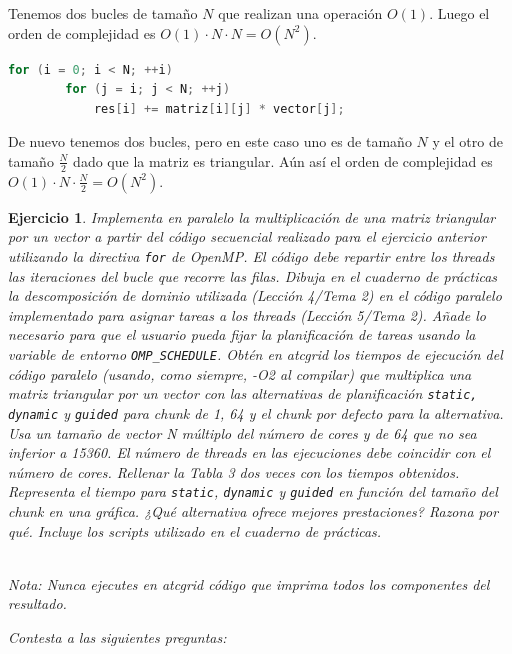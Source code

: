 \documentclass[11pt]{article}
\theoremstyle{definition-style}
\newtheorem{ejer}{Ejercicio}
\begin{document}
Tenemos dos bucles de tamaño $N$ que realizan una operación $O(1)$. Luego el orden de complejidad es $O(1) \cdot N \cdot N = O(N^2)$.

\begin{lstlisting}[language=C, caption=Producto de matriz triangular por vector]
for (i = 0; i < N; ++i)
        for (j = i; j < N; ++j)
            res[i] += matriz[i][j] * vector[j];
\end{lstlisting}

De nuevo tenemos dos bucles, pero en este caso uno es de tamaño $N$ y el otro de tamaño $\frac{N}{2}$ dado que la matriz es triangular. Aún así el orden de complejidad es $O(1) \cdot N \cdot \frac{N}{2} = O(N^2)$.

\begin{ejer}
    Implementa en paralelo la multiplicación de una matriz triangular por un vector a partir del código secuencial realizado para el ejercicio anterior utilizando la directiva \texttt{for} de OpenMP. El código debe repartir entre los threads las iteraciones del bucle que recorre las filas. Dibuja en el cuaderno de prácticas la descomposición de dominio utilizada (Lección 4/Tema 2) en el código paralelo implementado para asignar tareas a los threads (Lección 5/Tema 2). Añade lo necesario para que el usuario pueda fijar la planificación de tareas usando la variable de entorno \texttt{OMP\_SCHEDULE}. Obtén en atcgrid los tiempos de ejecución del código paralelo (usando, como siempre, -O2 al compilar) que multiplica una matriz triangular por un vector con las alternativas de planificación \texttt{static,} \texttt{dynamic} y \texttt{guided} para chunk de 1, 64 y el chunk por defecto para la alternativa. Usa un tamaño de vector N múltiplo del número de cores y de 64 que no sea inferior a 15360. El número de threads en las ejecuciones debe coincidir con el número de cores. Rellenar la Tabla 3 dos veces con los tiempos obtenidos. Representa el tiempo para \texttt{static}, \texttt{dynamic} y \texttt{guided} en función del tamaño del chunk en una gráfica. ¿Qué alternativa ofrece mejores prestaciones? Razona por qué. Incluye los scripts utilizado en el cuaderno de prácticas.
    
    \hfill\\
    \textit{Nota:} Nunca ejecutes en atcgrid código que imprima todos los componentes del resultado.
    
    Contesta a las siguientes preguntas:


\end{ejer}
\end{document}
